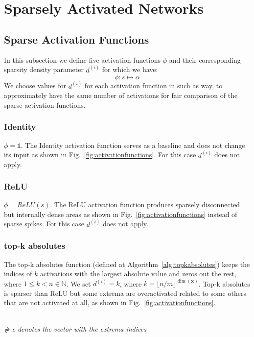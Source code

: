 \documentclass[journal]{IEEEtran}
\begin{document}
\section{Sparsely Activated Networks}\label{sec:sans}
\subsection{Sparse Activation Functions}\label{sec:safs}
In this subsection we define five activation functions $\phi$ and
their corresponding sparsity density parameter $d^{(i)}$ for which we have:
\begin{equation}
  \label{eq:phi}
  \phi: s \longmapsto \alpha
\end{equation}
We choose values for $d^{(i)}$ for each activation function in such
as way, to approximately have the same number of activations for fair
comparison of the sparse activation functions.
\subsubsection{Identity}\label{sec:identity}
$\phi = \mathds{1}$.
The Identity activation function serves as a baseline and does not
change its input as shown in
Fig.~\ref{fig:activationfunctions}.
For this case $d^{(i)}$ does not apply.
\subsubsection{ReLU}\label{sec:relu}
$\phi = ReLU(s)$.
The ReLU activation function produces sparsely disconnected but
internally dense areas as shown in
Fig.~\ref{fig:activationfunctions} instead of sparse spikes.
For this case $d^{(i)}$ does not apply.
\subsubsection{top-k absolutes}\label{sec:topkabsolutes}
The top-k absolutes function (defined at
Algorithm~\ref{alg:topkabsolutes}) keeps the indices of $k$
activations with the largest absolute value and zeros out the rest,
where $1 \le k < n \in \mathbb{N}$.
We set $d^{(i)} = k$, where $k = \lfloor n/m \rfloor^{\dim(\bm{x})}$.
Top-k absolutes is sparser than ReLU but some extrema are
overactivated related to some others that are not activated at all,
as shown in Fig.~\ref{fig:activationfunctions}.
\begin{algorithm}[H]
  \caption{top-k absolutes}\label{alg:topkabsolutes}
  \begin{algorithmic}[1]
    \renewcommand{\algorithmicrequire}{\textbf{Input:}}
    \renewcommand{\algorithmicensure}{\textbf{Output:}}
    \ENSURE{$\alpha$}
    \\\textit{\scriptsize \# e denotes the vector with the extrema indices}
    \ENDFOR{}
    \RETURN{$\alpha$}
  \end{algorithmic}
\end{algorithm}
\end{document}
